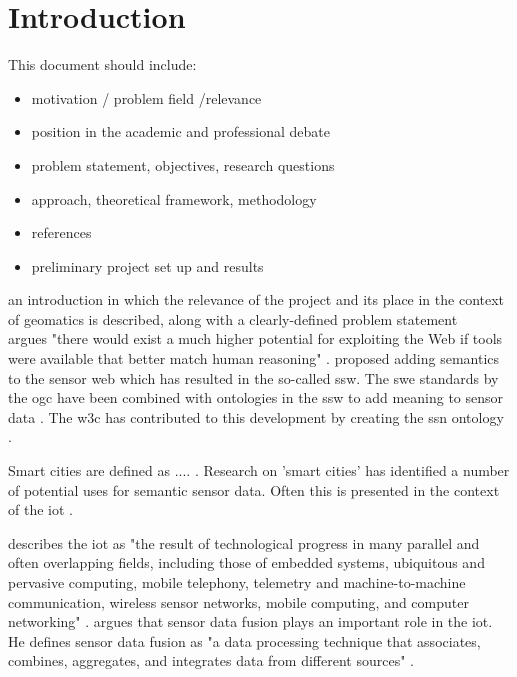 
\chapter{Introduction}
\label{chap:introduction}

This document should include:

\begin{itemize} 
\item motivation / problem field /relevance

\item position in the academic and professional debate

\item problem statement, objectives, research questions

\item approach, theoretical framework, methodology

\item references

\item preliminary project set up and results

\end{itemize}


an introduction in which the relevance of the project and its place in the context of geomatics is described, along with a clearly-defined problem statement\\

\cite{LD:Egenhofer} argues "there would exist a much higher potential for exploiting the Web if tools were available that better match human reasoning" \cite[p. 1]{LD:Egenhofer}. \cite{SSW:Sheth} proposed adding semantics to the sensor web which has resulted in the so-called \ac{ssw}. The \ac{swe} standards by the \ac{ogc} have been combined with ontologies in the \ac{ssw}  to add meaning to sensor data \citep{SSW:Pschorr, SSW:Henson}. The \ac{w3c} has contributed to this development by creating the \ac{ssn} ontology \citep{SSW:SSN_incubatorGroup}.

Smart cities are defined as .... \citep{SC:Townsend}. Research on 'smart cities' has identified a number of potential uses for semantic sensor data. Often this is presented in the context of the \ac{iot} \citep{IOT:Zanelli, SSW:Perera}. 

\cite{IOT:Fell} describes the \ac{iot} as "the result of technological progress in many parallel and often overlapping fields, including those of embedded systems, ubiquitous and pervasive computing, mobile telephony, telemetry and machine-to-machine communication, wireless sensor networks, mobile computing, and computer networking" \cite[p. 11]{IOT:Fell}. \cite{SSW:Perera} argues that sensor data fusion plays an important role in the \ac{iot}. He defines sensor data fusion as "a data processing technique that associates, combines, aggregates, and integrates data from different sources" \cite[p. 2]{SSW:Perera}. 

